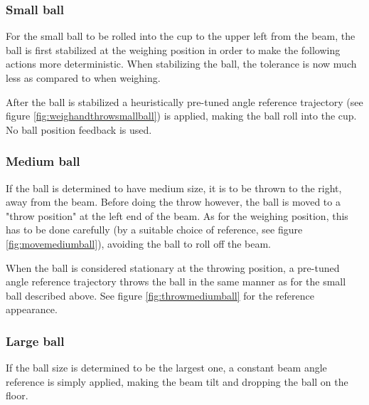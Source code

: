 \subsubsection{Small ball}\label{sec:small_ball_delivery}
For the small ball to be rolled into the cup to the upper left from the beam, the ball is first stabilized at the weighing position in order to make the following actions more deterministic.
When stabilizing the ball, the tolerance is now much less as compared to when weighing.

After the ball is stabilized a heuristically pre-tuned angle reference trajectory (see figure \ref{fig:weighandthrowsmallball}) is applied, making the ball roll into the cup.
No ball position feedback is used.

\subsubsection{Medium ball}\label{sec:medium_ball_delivery}
If the ball is determined to have medium size, it is to be thrown to the right, away from the beam.
Before doing the throw however, the ball is moved to a "throw position" at the left end of the beam.
As for the weighing position, this has to be done carefully (by a suitable choice of reference, see figure \ref{fig:movemediumball}), avoiding the ball to roll off the beam.

When the ball is considered stationary at the throwing position, a pre-tuned angle reference trajectory throws the ball in the same manner as for the small ball described above. See figure \ref{fig:throwmediumball} for the reference appearance.

\subsubsection{Large ball}\label{sec:large_ball_delivery}
If the ball size is determined to be the largest one, a constant beam angle reference is simply applied, making the beam tilt and dropping the ball on the floor.









